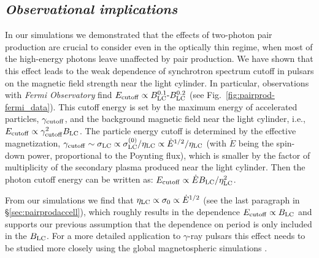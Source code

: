 \subsection*{\small \it Observational implications}

In our simulations we demonstrated that the effects of two-photon pair production are crucial to consider even in the optically thin regime, when most of the high-energy photons leave unaffected by pair production. We have shown that this effect leads to the weak dependence of synchrotron spectrum cutoff in pulsars on the magnetic field strength near the light cylinder. In particular, observations with {\it Fermi Observatory} find $E_{\rm cutoff}\propto B_{\rm LC}^{0.1}\text{-}B_{\rm LC}^{0.2}$ (see Fig.~\ref{fig:pairprod-fermi_data}). This cutoff energy is set by the maximum energy of accelerated particles, $\gamma_{\rm cutoff}$, and the background magnetic field near the light cylinder, i.e., $E_{\rm cutoff}\propto \gamma_{\rm cutoff}^2 B_{\rm LC}$. The particle energy cutoff is determined by the effective magnetization, $\gamma_{\rm cutoff}\sim \sigma_{\rm LC}\propto\sigma^{(0)}_{\rm LC}/\eta_{\rm LC}\propto \dot{E}^{1/2} / \eta_{\rm LC}$ (with $\dot{E}$ being the spin-down power, proportional to the Poynting flux), which is smaller by the factor of multiplicity of the secondary plasma produced near the light cylinder. Then the photon cutoff energy can be written as: $E_{\rm cutoff}\propto \dot{E}B_{\rm LC}/\eta_{\rm LC}^2$. \par

From our simulations we find that $\eta_{\rm LC}\propto \sigma_0\propto \dot{E}^{1/2}$ (see the last paragraph in \S\ref{sec:pairprodaccell}), which roughly results in the dependence $E_{\rm cutoff}\propto B_{\rm LC}$ and supports our previous assumption that the dependence on period is only included in the $B_{\rm LC}$. For a more detailed application to $\gamma$-ray pulsars this effect needs to be studied more closely using the global magnetospheric simulations \citep{PSAS18}. \par

